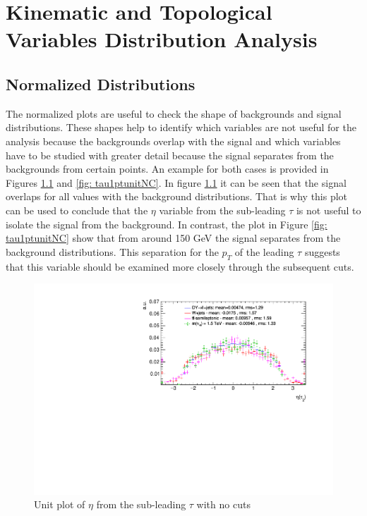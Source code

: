 \graphicspath{{DistributionAnalysis/Figures/}}

\chapter{Kinematic and Topological Variables Distribution Analysis} \label{sec: disanalysis}

\section{Normalized Distributions}\label{sec: Normalized Distributions}

The normalized plots are useful to check the shape of backgrounds and signal distributions. These shapes help to identify which variables are not useful for the analysis because the backgrounds overlap with the signal and which variables have to be studied with greater detail because the signal separates from the backgrounds from certain points. An example for both cases is provided in Figures \ref{fig: tau2etaunitNC} and \ref{fig: tau1ptunitNC}. In figure \ref{fig: tau2etaunitNC} it can be seen that the signal overlaps for all values with the background distributions. That is why this plot can be used to conclude that the $\eta$ variable from the sub-leading $\tau$ is not useful to isolate the signal from the background. In contrast, the plot in Figure \ref{fig: tau1ptunitNC} show that from around 150 GeV the signal separates from the background distributions. This separation for the $p_{T}$ of the leading $\tau$ suggests that this variable should be examined more closely through the subsequent cuts. 

\begin{figure}
\centering
\includegraphics[width=\linewidth]{Plots/tau2_eta_unitNC.pdf}
\caption{Unit plot of $\eta$ from the sub-leading $\tau$ with no cuts}
\label{fig: tau2etaunitNC}
\end{figure}

